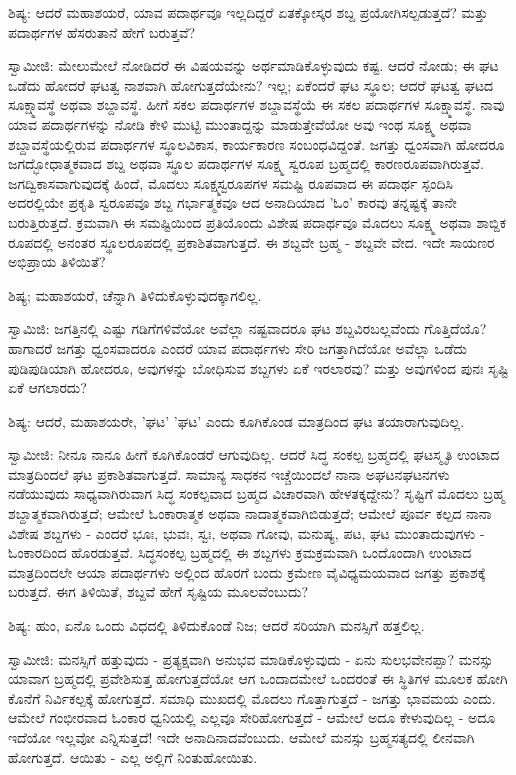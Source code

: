 ಶಿಷ್ಯ: ಆದರೆ ಮಹಾಶಯರೆ, ಯಾವ ಪದಾರ್ಥವೂ ಇಲ್ಲದಿದ್ದರೆ ಏತಕ್ಕೋಸ್ಕರ ಶಬ್ದ ಪ್ರಯೋಗಿಸಲ್ಪಡುತ್ತದೆ? ಮತ್ತು ಪದಾರ್ಥಗಳ ಹೆಸರುತಾನೆ ಹೇಗೆ ಬರುತ್ತವೆ?

ಸ್ವಾಮೀಜಿ: ಮೇಲುಮೇಲೆ ನೋಡಿದರೆ ಈ ವಿಷಯವನ್ನು ಅರ್ಥಮಾಡಿಕೊಳ್ಳುವುದು ಕಷ್ಟ. ಆದರೆ ನೋಡು; ಈ ಘಟ ಒಡೆದು ಹೋದರೆ ಘಟತ್ವ ನಾಶವಾಗಿ ಹೋಗುತ್ತದೆಯೇನು? ಇಲ್ಲ; ಏಕೆಂದರೆ ಘಟ ಸ್ಥೂಲ; ಆದರೆ ಘಟತ್ವ ಘಟದ ಸೂಕ್ಷ್ಮಾವಸ್ಥೆ ಅಥವಾ ಶಬ್ದಾವಸ್ಥೆ. ಹೀಗೆ ಸಕಲ ಪದಾರ್ಥಗಳ ಶಬ್ದಾವಸ್ಥೆಯೆ ಈ ಸಕಲ ಪದಾರ್ಥಗಳ ಸೂಕ್ಷ್ಮಾವಸ್ಥೆ. ನಾವು ಯಾವ ಪದಾರ್ಥಗಳನ್ನು ನೋಡಿ ಕೇಳಿ ಮುಟ್ಟಿ ಮುಂತಾದ್ದನ್ನು ಮಾಡುತ್ತೇವೆಯೋ ಅವು ಇಂಥ ಸೂಕ್ಷ್ಮ ಅಥವಾ ಶಬ್ದಾವಸ್ಥೆಯಲ್ಲಿರುವ ಪದಾರ್ಥಗಳ ಸ್ಥೂಲವಿಕಾಸ, ಕಾರ್ಯಕಾರಣ ಸಂಬಂಧವಿದ್ದಂತೆ. ಜಗತ್ತು ಧ್ವಂಸವಾಗಿ ಹೋದರೂ ಜಗದ್ಭೋಧಾತ್ಮಕವಾದ ಶಬ್ದ ಅಥವಾ ಸ್ಥೂಲ ಪದಾರ್ಥಗಳ ಸೂಕ್ಷ್ಮ ಸ್ವರೂಪ ಬ್ರಹ್ಮದಲ್ಲಿ ಕಾರಣರೂಪವಾಗಿರುತ್ತವೆ. ಜಗದ್ವಿಕಾಸವಾಗುವುದಕ್ಕೆ ಹಿಂದೆ, ಮೊದಲು ಸೂಕ್ಷ್ಮಸ್ವರೂಪಗಳ ಸಮಷ್ಟಿ ರೂಪವಾದ ಈ ಪದಾರ್ಥ ಸ್ಪಂದಿಸಿ ಅದರಲ್ಲಿಯೇ ಪ್ರಕೃತಿ ಸ್ವರೂಪವೂ ಶಬ್ದ ಗರ್ಭಾತ್ಮಕವೂ ಆದ ಅನಾದಿಯಾದ 'ಓಂ' ಕಾರವು ತನ್ನಷ್ಟಕ್ಕೆ ತಾನೇ ಬರುತ್ತಿರುತ್ತದೆ. ಕ್ರಮವಾಗಿ ಈ ಸಮಷ್ಟಿಯಿಂದ ಪ್ರತಿಯೊಂದು ವಿಶೇಷ ಪದಾರ್ಥವೂ ಮೊದಲು ಸೂಕ್ಷ್ಮ ಅಥವಾ ಶಾಬ್ದಿಕ ರೂಪದಲ್ಲಿ ಅನಂತರ ಸ್ಥೂಲರೂಪದಲ್ಲಿ ಪ್ರಕಾಶಿತವಾಗುತ್ತದೆ. ಈ ಶಬ್ದವೇ ಬ್ರಹ್ಮ - ಶಬ್ದವೇ ವೇದ. ಇದೇ ಸಾಯಣರ ಅಭಿಪ್ರಾಯ ತಿಳಿಯಿತೆ?

ಶಿಷ್ಯ; ಮಹಾಶಯರೆ, ಚೆನ್ನಾಗಿ ತಿಳಿದುಕೊಳ್ಳುವುದಕ್ಕಾಗಲಿಲ್ಲ.

ಸ್ವಾಮಿಜಿ: ಜಗತ್ತಿನಲ್ಲಿ ಎಷ್ಟು ಗಡಿಗೆಗಳಿವೆಯೋ ಅವೆಲ್ಲಾ ನಷ್ಟವಾದರೂ ಘಟ ಶಬ್ದವಿರಬಲ್ಲವೆಂದು ಗೊತ್ತಿದೆಯೊ? ಹಾಗಾದರೆ ಜಗತ್ತು ಧ್ವಂಸವಾದರೂ ಎಂದರೆ ಯಾವ ಪದಾರ್ಥಗಳು ಸೇರಿ ಜಗತ್ತಾಗಿದೆಯೋ ಅವೆಲ್ಲಾ ಒಡೆದು ಪುಡಿಪುಡಿಯಾಗಿ ಹೋದರೂ, ಅವುಗಳನ್ನು ಬೋಧಿಸುವ ಶಬ್ದಗಳು ಏಕೆ ಇರಲಾರವು? ಮತ್ತು ಅವುಗಳಿಂದ ಪುನಃ ಸೃಷ್ಟಿ ಏಕೆ ಆಗಲಾರದು?

ಶಿಷ್ಯ: ಆದರೆ, ಮಹಾಶಯರೇ, 'ಘಟ' 'ಘಟ' ಎಂದು ಕೂಗಿಕೊಂಡ ಮಾತ್ರದಿಂದ ಘಟ ತಯಾರಾಗುವುದಿಲ್ಲ.

ಸ್ವಾಮೀಜಿ: ನೀನೂ ನಾನೂ ಹೀಗೆ ಕೂಗಿಕೊಂಡರೆ ಆಗುವುದಿಲ್ಲ. ಆದರೆ ಸಿದ್ಧ ಸಂಕಲ್ಪ ಬ್ರಹ್ಮದಲ್ಲಿ ಘಟಸ್ಮೃತಿ ಉಂಟಾದ ಮಾತ್ರದಿಂದಲೆ ಘಟ ಪ್ರಕಾಶಿತವಾಗುತ್ತದೆ. ಸಾಮಾನ್ಯ ಸಾಧಕನ ಇಚ್ಚೆಯಿಂದಲೆ ನಾನಾ ಅಘಟನಘಟನಗಳು ನಡೆಯುವುದು ಸಾಧ್ಯವಾಗಿರುವಾಗ ಸಿದ್ಧ ಸಂಕಲ್ಪವಾದ ಬ್ರಹ್ಮದ ವಿಚಾರವಾಗಿ ಹೇಳತಕ್ಕದ್ದೇನು? ಸೃಷ್ಟಿಗೆ ಮೊದಲು ಬ್ರಹ್ಮ ಶಬ್ದಾತ್ಮಕವಾಗಿರುತ್ತದೆ; ಆಮೇಲೆ ಓಂಕಾರಾತ್ಮಕ ಅಥವಾ ನಾದಾತ್ಮಕವಾಗಿಬಿಡುತ್ತದೆ; ಆಮೇಲೆ ಪೂರ್ವ ಕಲ್ಪದ ನಾನಾ ವಿಶೇಷ ಶಬ್ದಗಳು - ಎಂದರೆ ಭೂಃ, ಭುವಃ, ಸ್ವಃ, ಅಥವಾ ಗೋವು, ಮನುಷ್ಯ, ಪಟ, ಘಟ ಮುಂತಾದುವುಗಳು - ಓಂಕಾರದಿಂದ ಹೊರಡುತ್ತವೆ. ಸಿದ್ಧಸಂಕಲ್ಪ ಬ್ರಹ್ಮದಲ್ಲಿ ಈ ಶಬ್ದಗಳು ಕ್ರಮಕ್ರಮವಾಗಿ ಒಂದೊಂದಾಗಿ ಉಂಟಾದ ಮಾತ್ರದಿಂದಲೇ ಆಯಾ ಪದಾರ್ಥಗಳು ಅಲ್ಲಿಂದ ಹೊರಗೆ ಬಂದು ಕ್ರಮೇಣ ವೈವಿಧ್ಯಮಯವಾದ ಜಗತ್ತು ಪ್ರಕಾಶಕ್ಕೆ ಬರುತ್ತದೆ. ಈಗ ತಿಳಿಯಿತೆ, ಶಬ್ದವೆ ಹೇಗೆ ಸೃಷ್ಟಿಯ ಮೂಲವೆಂಬುದು?

ಶಿಷ್ಯ: ಹುಂ, ಏನೊ ಒಂದು ವಿಧದಲ್ಲಿ ತಿಳಿದುಕೊಂಡೆ ನಿಜ; ಆದರೆ ಸರಿಯಾಗಿ ಮನಸ್ಸಿಗೆ ಹತ್ತಲಿಲ್ಲ.

ಸ್ವಾಮೀಜಿ: ಮನಸ್ಸಿಗೆ ಹತ್ತುವುದು - ಪ್ರತ್ಯಕ್ಷವಾಗಿ ಅನುಭವ ಮಾಡಿಕೊಳ್ಳುವುದು - ಏನು ಸುಲಭವೇನಪ್ಪಾ? ಮನಸ್ಸು ಯಾವಾಗ ಬ್ರಹ್ಮದಲ್ಲಿ ಪ್ರವೇಶಿಸುತ್ತ ಹೋಗುತ್ತದೆಯೋ ಆಗ ಒಂದಾದಮೇಲೆ ಒಂದರಂತೆ ಈ ಸ್ಥಿತಿಗಳ ಮೂಲಕ ಹೋಗಿ ಕೊನೆಗೆ ನಿರ್ವಿಕಲ್ಪಕ್ಕೆ ಹೋಗುತ್ತದೆ. ಸಮಾಧಿ ಮುಖದಲ್ಲಿ ಮೊದಲು ಗೊತ್ತಾಗುತ್ತದೆ - ಜಗತ್ತು ಭಾವಮಯ ಎಂದು. ಆಮೇಲೆ ಗಂಭೀರವಾದ ಓಂಕಾರ ಧ್ವನಿಯಲ್ಲಿ ಎಲ್ಲವೂ ಸೇರಿಹೋಗುತ್ತದೆ - ಆಮೇಲೆ ಅದೂ ಕೇಳುವುದಿಲ್ಲ - ಅದೂ ಇದೆಯೋ ಇಲ್ಲವೋ ಎನ್ನಿಸುತ್ತದೆ! ಇದೇ ಅನಾದಿನಾದವೆಂಬುದು. ಆಮೇಲೆ ಮನಸ್ಸು ಬ್ರಹ್ಮಸತ್ಯದಲ್ಲಿ ಲೀನವಾಗಿ ಹೋಗುತ್ತದೆ. ಆಯಿತು - ಎಲ್ಲ ಅಲ್ಲಿಗೆ ನಿಂತುಹೋಯಿತು.

